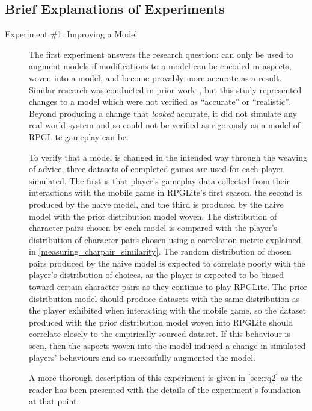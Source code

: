 \subsection{Brief Explanations of Experiments}
\label{experiments_introduced_briefly}

\begin{description}
  \item[Experiment \#1: Improving a Model] The first experiment answers the
research question: \emph{\rqtwo{}} \Aop{} can only be used to augment models if
modifications to a model can be encoded in aspects, woven into a model, and
become provably more accurate as a result. Similar research was conducted in
prior work~\cite{wallis2018caise}, but this study represented changes to a model
which were not verified as ``accurate'' or ``realistic''. Beyond producing a
change that \emph{looked} accurate, it did not simulate any real-world system
and so could not be verified as rigorously as a model of RPGLite gameplay can
be.

To verify that a model is changed in the intended way through the weaving of
advice, three datasets of completed games are used for each player simulated.
The first is that player's gameplay data collected from their interactions with
the mobile game in RPGLite's first season, the second is produced by the naive
model, and the third is produced by the naive model with the prior distribution
model woven. The distribution of character pairs chosen by each model is
compared with the player's distribution of character pairs chosen using a
correlation metric explained in \cref{measuring_charpair_similarity}. The random
distribution of chosen pairs produced by the naive model is expected to
correlate poorly with the player's distribution of choices, as the player is
expected to be biased toward certain character pairs as they continue to play
RPGLite. The prior distribution model should produce datasets with the same
distribution as the player exhibited when interacting with the mobile game, so
the dataset produced with the prior distribution model woven into RPGLite should
correlate closely to the empirically sourced dataset. If this behaviour is seen,
then the aspects woven into the model induced a change in simulated players'
behaviours and so successfully augmented the model.

A more thorough description of this experiment is given in \cref{sec:rq2} as the
reader has been presented with the details of the experiment's foundation at
that point.
  

\end{description}

